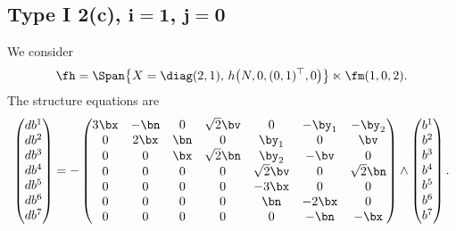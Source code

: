 \subsection[Type I 2(c), $i=1$, $j=0$]{Type I 2(c), $\boldsymbol{i=1}$, $\boldsymbol{j=0}$}
We consider
\begin{gather*}\fh=\Span\big\{X=\diag(2,1),\, h\big(N,0,(0,1)^\top,0\big) \big\}\ltimes\fm(1,0,2).\end{gather*}
The structure equations are
\begin{gather}\label{EI2(c)i=1}\left(\begin{matrix} db^1\\db^2\\db^3\\db^4\\db^5\\db^6\\db^7\end{matrix}\right) = -\left(
\begin{matrix}
3{\bx} &-\bn&0&\sqrt2 \bv&0&-\by_1&-\by_2\\
0&2\bx&\bn&0&\by_1&0&\bv\\
0&0&\bx&\sqrt 2 \bn&\by_2&-\bv&0\\
0&0&0&0&\sqrt2 \bv&0&\sqrt 2 \bn\\
0&0&0&0&-3\bx&0&0\\
0&0&0&0&\bn&-2\bx&0\\
0&0&0&0&0&-\bn&-\bx
\end{matrix}\right) \wedge \left(\begin{matrix} b^1\\b^2\\b^3\\b^4\\b^5\\b^6\\b^7\end{matrix}\right).
\end{gather}
